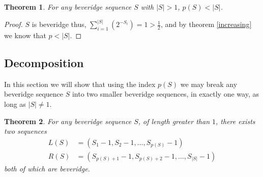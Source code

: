 \documentclass{macjourn}
\def\useLim{}
\newcommand{\sumfrom}[3]{\sum\useLim_{#1}^{#2} \left( {#3} \right)}
\newcommand{\cardinality}[1]{\left| #1 \right|}
\newtheorem{theorem}{Theorem}[subsection]
\theoremstyle{definition}
\begin{document}
	
	\begin{theorem}\label{edge}
		For any beveridge sequence $S$ with $\cardinality S > 1$, $p(S) < \cardinality S$.
	\end{theorem}
	
	\begin{proof}
		$S$ is beveridge thus, $\sumfrom{i=1}{\cardinality S}{2^{-S_i}} = 1 > \frac12$, and by theorem    \ref{increasing} we know that $p < \cardinality S$.
	\end{proof}
	
	\subsection{Decomposition}
	
	In this section we will show that using the index $p(S)$ we may break any beveridge sequence $S$ into two smaller beveridge sequences, in exactly one way, as long as $\cardinality S \not= 1$.
	
	\begin{theorem} \label{decompose}
		For any beveridge sequence $S$, of length greater than $1$, there exists two sequences
		\begin{align*}
			L(S) &= (S_1 - 1, S_2 - 1, \ldots, S_{p(S)} - 1) \\
			R(S) &= (S_{p(S)+1} - 1, S_{p(S)+2} - 1, \ldots, S_{\cardinality S} - 1)
		\end{align*}
		both of which are beveridge.
	\end{theorem}
	
\end{document}
